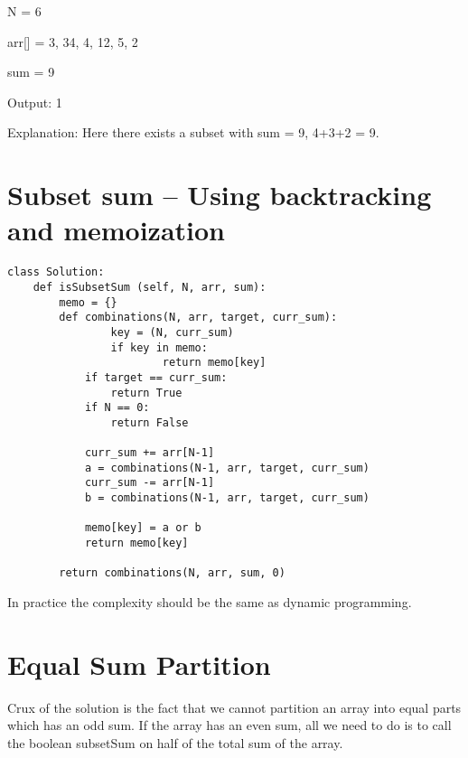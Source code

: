 \documentclass[24pt, a4]{article}
\begin{document}
N = 6

arr[] = {3, 34, 4, 12, 5, 2}

sum = 9

Output: 1 

Explanation: Here there exists a subset with
sum = 9, 4+3+2 = 9.

\newpage
\section{Subset sum -- Using backtracking and memoization}
\begin{lstlisting}
class Solution:
    def isSubsetSum (self, N, arr, sum):
        memo = {}
        def combinations(N, arr, target, curr_sum):
        		key = (N, curr_sum)
        		if key in memo:
        				return memo[key]
            if target == curr_sum:
                return True
            if N == 0:
                return False
            
            curr_sum += arr[N-1]
            a = combinations(N-1, arr, target, curr_sum)
            curr_sum -= arr[N-1]
            b = combinations(N-1, arr, target, curr_sum)
            
            memo[key] = a or b
            return memo[key]
            
        return combinations(N, arr, sum, 0)
\end{lstlisting}

In practice the complexity should be the same as dynamic programming.

\newpage
\section{Equal Sum Partition}

Crux of the solution is the fact that we cannot partition an array into equal parts which has an odd sum. If the array has an even sum, all we need to do is to call the boolean subsetSum on half of the total sum of the array.
\end{document}
